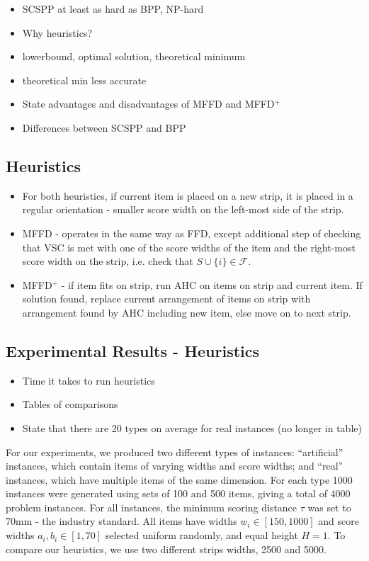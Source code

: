 \documentclass{elsarticle}
\begin{document}
\begin{itemize}
	\item SCSPP at least as hard as BPP, NP-hard
	\item Why heuristics?
	\item lowerbound, optimal solution, theoretical minimum
	\item theoretical min less accurate
	\item State advantages and disadvantages of MFFD and MFFD$^+$
	\item Differences between SCSPP and BPP
\end{itemize}

\subsection{Heuristics}
\begin{itemize}
	\item For both heuristics, if current item is placed on a new strip, it is placed in a regular orientation - smaller score width on the left-most side of the strip.
	\item MFFD - operates in the same way as FFD, except additional step of checking that VSC is met with one of the score widths of the item and the right-most score width on the strip, i.e. check that $S \cup \{i\} \in \mathcal{F}$.
	\item MFFD$^+$ - if item fits on strip, run AHC on items on strip and current item. If solution found, replace current arrangement of items on strip with arrangement found by AHC including new item, else move on to next strip.
\end{itemize}


\subsection{Experimental Results - Heuristics}
\begin{itemize}
	\item Time it takes to run heuristics
	\item Tables of comparisons
	\item State that there are 20 types on average for real instances (no longer in table)
\end{itemize}

For our experiments, we produced two different types of instances: ``artificial'' instances, which contain items of varying widths and score widths; and ``real'' instances, which have multiple items of the same dimension. For each type 1000 instances were generated using sets of 100 and 500 items, giving a total of 4000 problem instances. For all instances, the minimum scoring distance $\tau$ was set to 70mm - the industry standard. All items have widths $w_i \in [150,1000]$ and score widths $a_i, b_i \in [1,70]$ selected uniform randomly, and equal height $H=1$. To compare our heuristics, we use two different strips widths, 2500 and 5000.
\end{document}
